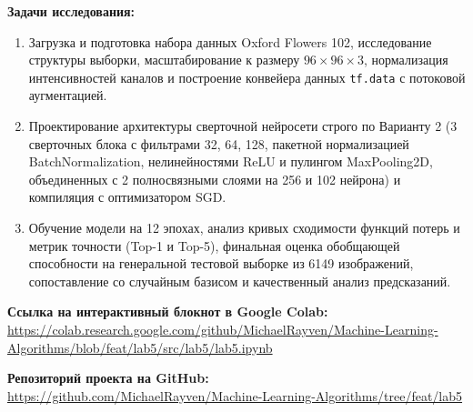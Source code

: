 \textbf{Задачи исследования:}
\begin{enumerate}
    \item Загрузка и подготовка набора данных Oxford Flowers 102, исследование структуры выборки, масштабирование к размеру $96 \times 96 \times 3$, нормализация интенсивностей каналов и построение конвейера данных \texttt{tf.data} с потоковой аугментацией.
    \item Проектирование архитектуры сверточной нейросети строго по Варианту 2 (3 сверточных блока с фильтрами 32, 64, 128, пакетной нормализацией BatchNormalization, нелинейностями ReLU и пулингом MaxPooling2D, объединенных с 2 полносвязными слоями на 256 и 102 нейрона) и компиляция с оптимизатором SGD.
    \item Обучение модели на 12 эпохах, анализ кривых сходимости функций потерь и метрик точности (Top-1 и Top-5), финальная оценка обобщающей способности на генеральной тестовой выборке из 6149 изображений, сопоставление со случайным базисом и качественный анализ предсказаний.
\end{enumerate}

\vspace{12pt}
\noindent \textbf{Ссылка на интерактивный блокнот в Google Colab:} \\
{\footnotesize\url{https://colab.research.google.com/github/MichaelRayven/Machine-Learning-Algorithms/blob/feat/lab5/src/lab5/lab5.ipynb}}

\vspace{6pt}
\noindent \textbf{Репозиторий проекта на GitHub:} \\
{\footnotesize\url{https://github.com/MichaelRayven/Machine-Learning-Algorithms/tree/feat/lab5}}
